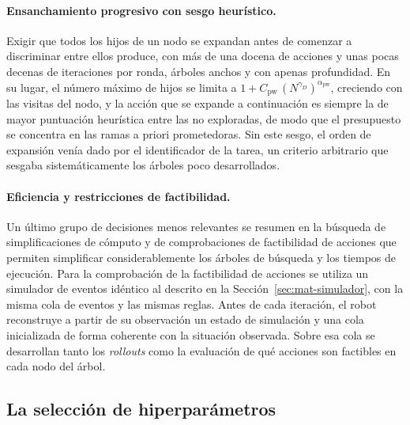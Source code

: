 \paragraph{Ensanchamiento progresivo con sesgo heurístico.} Exigir que todos los hijos de un nodo se expandan antes de comenzar a discriminar entre ellos produce, con más de una docena de acciones y unas pocas decenas de iteraciones por ronda, árboles anchos y con apenas profundidad. En su lugar, el número máximo de hijos se limita a $1+C_{\mathrm{pw}}\,(N^{\gamma_D})^{\alpha_{\mathrm{pw}}}$, creciendo con las visitas del nodo, y la acción que se expande a continuación es siempre la de mayor puntuación heurística entre las no exploradas, de modo que el presupuesto se concentra en las ramas a priori prometedoras. Sin este sesgo, el orden de expansión venía dado por el identificador de la tarea, un criterio arbitrario que sesgaba sistemáticamente los árboles poco desarrollados.

\paragraph{Eficiencia y restricciones de factibilidad.} Un último grupo de decisiones menos relevantes se resumen en la búsqueda de simplificaciones de cómputo y de comprobaciones de factibilidad de acciones que permiten simplificar considerablemente los árboles de búsqueda y los tiempos de ejecución. Para la comprobación de la factibilidad de acciones se utiliza un simulador de eventos idéntico al descrito en la Sección~\ref{sec:mat-simulador}, con la misma cola de eventos y las mismas reglas. Antes de cada iteración, el robot reconstruye a partir de su observación un estado de simulación y una cola inicializada de forma coherente con la situación observada. Sobre esa cola se desarrollan tanto los \textit{rollouts} como la evaluación de qué acciones son factibles en cada nodo del árbol.

\subsection{La selección de hiperparámetros} \label{subsec:mat-decmcts-hiper}

